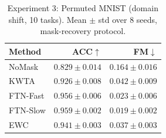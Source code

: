 \begin{table}[t]
\caption{Experiment 3: Permuted MNIST (domain shift, 10 tasks). Mean $\pm$ std over 8 seeds, mask-recovery protocol.}
\label{tab:exp3}
\vskip 0.05in
\begin{center}\begin{small}\begin{sc}
\begin{tabular}{lrr}
\toprule
Method & ACC$\uparrow$ & FM$\downarrow$ \\
\midrule
NoMask & $0.829\pm0.014$ & $0.164\pm0.016$ \\
KWTA & $0.926\pm0.008$ & $0.042\pm0.009$ \\
FTN-Fast & $0.956\pm0.006$ & $0.023\pm0.006$ \\
FTN-Slow & $0.959\pm0.002$ & $0.019\pm0.002$ \\
EWC & $0.941\pm0.003$ & $0.037\pm0.003$ \\
\bottomrule
\end{tabular}
\end{sc}\end{small}\end{center}
\vskip -0.1in
\end{table}
